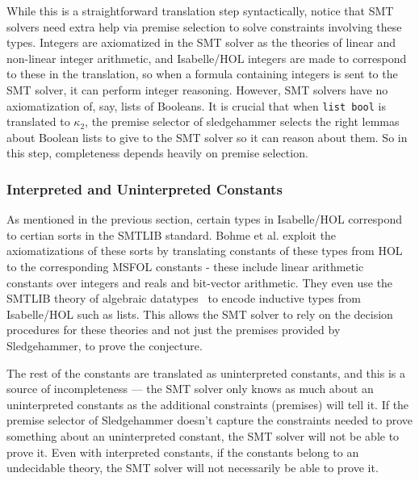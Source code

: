 \documentclass{article}
\begin{document}
	While this is a straightforward
	translation step syntactically, 
	notice that SMT solvers need 
	extra help via premise selection 
	to solve constraints involving 
	these types. Integers are 
	axiomatized in the SMT solver as 
	the theories of linear and 
	non-linear integer arithmetic, and 
	Isabelle/HOL integers are made to 
	correspond to these in the translation, 
	so when a formula containing 
	integers is sent to the SMT solver, 
	it can perform integer reasoning. 
	However, SMT solvers have no 
	axiomatization of, say, lists 
	of Booleans. It is crucial that when 
	\texttt{list bool} is 
	translated to $\kappa_2$, the 
	premise selector of sledgehammer
	selects the right lemmas about 
	Boolean lists to give to the 
	SMT solver so it can reason 
	about them. So in this step, 
	completeness depends heavily on 
	premise selection.
	
	\subsubsection{Interpreted and Uninterpreted Constants}
	As mentioned in the previous section,
	certain types in Isabelle/HOL correspond
	to certian sorts in the SMTLIB standard.
	Bohme et al. exploit the axiomatizations 
	of these sorts by translating constants 
	of these types from HOL to the 
	corresponding MSFOL constants - these 
	include linear arithmetic constants over 
	integers and reals and bit-vector 
	arithmetic. They even use the SMTLIB 
	theory of algebraic 
	datatypes~\cite{BarST-PDPAR-06} to 
	encode inductive types from Isabelle/HOL
	such as lists. This allows the SMT solver
	to rely on the decision procedures for 
	these theories and not just the premises
	provided by Sledgehammer, to prove the 
	conjecture. 
	
	The rest of the constants are 
	translated as uninterpreted constants, 
	and this is a source of 
	incompleteness --- the SMT solver only 
	knows as much about an uninterpreted 
	constants as the additional constraints 
	(premises) will tell it. If the premise 
	selector of Sledgehammer doesn't capture 
	the constraints needed to prove something
	about an uninterpreted constant, the SMT 
	solver will not be able to prove it.
	Even with interpreted constants, if the 
	constants belong to an undecidable theory,
	the SMT solver will not necessarily be 
	able to prove it.
	
	
	
	
\end{document}
